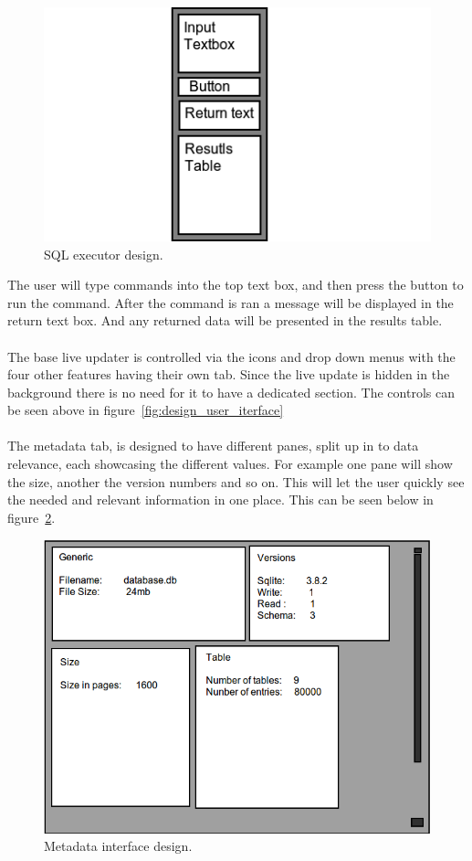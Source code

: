 \begin{figure}[H]
	\centering
	\includegraphics[scale=0.7]{images/ui_sqlexe_design.png}
	\caption{SQL executor design.}
	\label{fig:des_sql_exe}
\end{figure}

The user will type commands into the top text box, and then press the button to run the command. After the command is ran a message will be displayed in the return text box. And any returned data will be presented in the results table.
\\\\
The base live updater is controlled via the icons and drop down menus with the four other features having their own tab.  Since the live update is hidden in the background there is no need for it to have a dedicated section. The controls can be seen above in figure~\ref{fig:design_user_iterface}
\\\\
The metadata tab, is designed to have different panes, split up in to data relevance, each showcasing the different values. For example one pane will show the size, another the version numbers and so on. This will let the user quickly see the needed and relevant information in one place. This can be seen below in figure~\ref{fig:des_ui_meta}. 

\begin{figure}[H]
	\centering
	\includegraphics[scale=0.32]{images/ui_meatadata.png}
	\caption{Metadata interface design.}
	\label{fig:des_ui_meta}
\end{figure}

